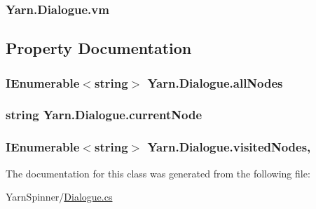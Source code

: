 \hypertarget{a00072_a8c1319357a9df6cff051328fb33224c7}{
\subsubsection[{vm}]{ Yarn.\-Dialogue.\-vm\hspace{0.3cm}{\ttfamily [private]}}}\label{a00072_a8c1319357a9df6cff051328fb33224c7}


\subsection{Property Documentation}
\hypertarget{a00072_a0ee573e3d072bccf98ba1d975612d42c}{
\subsubsection[{all\-Nodes}]{\setlength{\rightskip}{0pt plus 5cm}I\-Enumerable$<$string$>$ Yarn.\-Dialogue.\-all\-Nodes\hspace{0.3cm}{\ttfamily [get]}}}\label{a00072_a0ee573e3d072bccf98ba1d975612d42c}
\hypertarget{a00072_af368b5c342d585dc6953876c5965ccc8}{
\subsubsection[{current\-Node}]{\setlength{\rightskip}{0pt plus 5cm}string Yarn.\-Dialogue.\-current\-Node\hspace{0.3cm}{\ttfamily [get]}}}\label{a00072_af368b5c342d585dc6953876c5965ccc8}
\hypertarget{a00072_ac5661051e0b7f44527fe526c7766dbbf}{
\subsubsection[{visited\-Nodes}]{\setlength{\rightskip}{0pt plus 5cm}I\-Enumerable$<$string$>$ Yarn.\-Dialogue.\-visited\-Nodes\hspace{0.3cm}{\ttfamily [get]}, {\ttfamily [set]}}}\label{a00072_ac5661051e0b7f44527fe526c7766dbbf}


The documentation for this class was generated from the following file\-:\begin{DoxyCompactItemize}
\item 
Yarn\-Spinner/\hyperlink{a00265}{Dialogue.\-cs}\end{DoxyCompactItemize}
